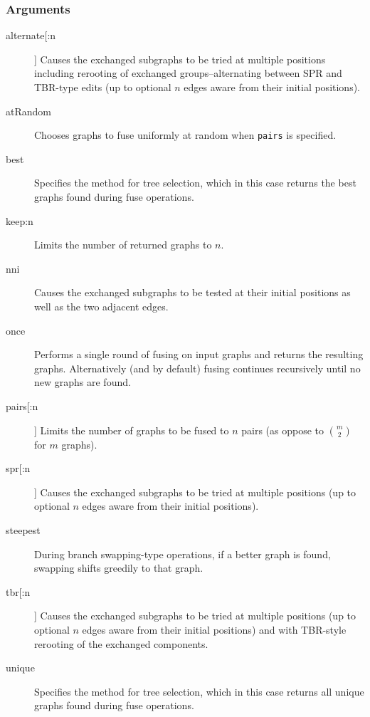 	\subsubsection{Arguments}
	\begin{description}
		
		\item [alternate[:n]] Causes the exchanged subgraphs to be tried at multiple positions including rerooting of 
		exchanged groups--alternating between SPR and TBR-type edits (up to optional 
		$n$ edges aware from their initial positions).
		
		\item [atRandom] Chooses graphs to fuse uniformly at random when \texttt{pairs} is specified. 
		
		\item [best] Specifies the method for tree selection, which in this case returns the best graphs 
		found during fuse operations.		
		
		\item [keep:n] Limits the number of returned graphs to $n$. 
		
		\item [nni] Causes the exchanged subgraphs to be tested at their initial positions as well as the 
		two adjacent edges.
		
		\item [once] Performs a single round of fusing on input graphs and returns the resulting graphs. 
		Alternatively (and by default) fusing continues recursively until no new graphs are found.
		
		\item [pairs[:n]] Limits the number of graphs to be fused to $n$ pairs (as oppose to $\binom{m}{2}$ for $m$ graphs).
		
		\item [spr[:n]] Causes the exchanged subgraphs to be tried at multiple positions (up to optional 
		$n$ edges aware from their initial positions).
		
		\item [steepest] During branch swapping-type operations, if a better graph is found, swapping shifts greedily to
		that graph. 
		
		\item [tbr[:n]] Causes the exchanged subgraphs to be tried at multiple positions (up to optional 
		$n$ edges aware from their initial positions) and with TBR-style rerooting of the exchanged 
		components.
		
		\item [unique] Specifies the method for tree selection, which in this case returns all unique 
		graphs found during fuse operations.	
	\end{description}	
	
